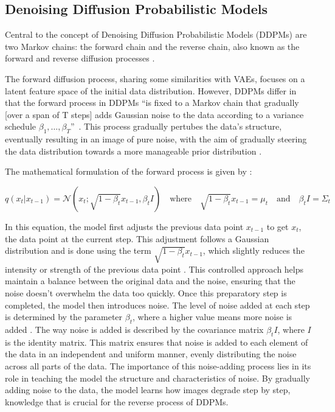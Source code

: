 \subsection{Denoising Diffusion Probabilistic Models}\label{DDPMs}

Central to the concept of Denoising Diffusion Probabilistic Models (DDPMs) are two Markov chains: the forward chain and the reverse chain, also known as the forward and reverse diffusion processes \citep{sohlDDPM}.

The forward diffusion process, sharing some similarities with VAEs, focuses on a latent feature space of the initial data distribution. However, DDPMs differ in that the forward process in DDPMs ``is fixed to a Markov chain that gradually [over a span of T steps] adds Gaussian noise to the data according to a variance schedule \(\beta_1, \ldots, \beta_T \)''~\cite{hoDDPMs}. This process gradually pertubes the data's structure, eventually resulting in an image of pure noise, with the aim of gradually steering the data distribution towards a more manageable prior distribution \citep{yangdiffusionSummary, pooleDreamfusion}. 

The mathematical formulation of the forward process is given by \citeauthor{martinez2023understanding}:

\[
q(x_t | x_{t-1}) = \mathcal{N}(x_t; \sqrt{1 - \beta_t}x_{t-1}, \beta_t I) \quad \text{where} \quad \sqrt{1 - \beta_t}x_{t-1} = \mu_t \quad \text{and} \quad \beta_t I = \Sigma_t
\] 

In this equation, the model first adjusts the previous data point \( x_{t-1} \) to get \( x_t \), the data point at the current step. This adjustment follows a Gaussian distribution and is done using the term \( \sqrt{1 - \beta_t} x_{t-1} \), which slightly reduces the intensity or strength of the previous data point \citep{sohlDDPM, hoDDPMs}. This controlled approach helps maintain a balance between the original data and the noise, ensuring that the noise doesn't overwhelm the data too quickly. Once this preparatory step is completed, the model then introduces noise. The level of noise added at each step is determined by the parameter \( \beta_t \), where a higher value means more noise is added \citep{kingma2023variationalDM}. The way noise is added is described by the covariance matrix \( \beta_t I \), where \( I \) is the identity matrix. This matrix ensures that noise is added to each element of the data in an independent and uniform manner, evenly distributing the noise across all parts of the data. The importance of this noise-adding process lies in its role in teaching the model the structure and characteristics of noise. By gradually adding noise to the data, the model learns how images degrade step by step, knowledge that is crucial for the reverse process of DDPMs.

